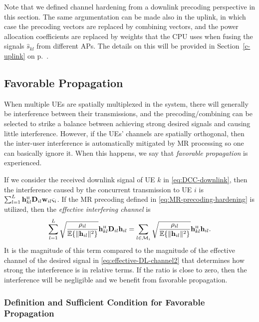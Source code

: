 Note that we defined channel hardening from a downlink precoding perspective in this section. The same argumentation can be made also in the uplink, in which case the precoding vectors are replaced by combining vectors, and the power allocation coefficients are replaced by weights that the CPU uses when fusing the signals $\hat{s}_{kl}$ from different APs. The details on this will be provided in Section~\ref{c-uplink} on p.~\pageref{c-uplink}.




\subsection{Favorable Propagation}
\label{subsec-favorable-propagation}

When multiple UEs are spatially multiplexed in the system, there will generally be interference between their transmissions, and the precoding/combining can be selected to strike a balance between achieving strong desired signals and causing little interference. 
However, if the UEs' channels are spatially orthogonal, then the inter-user interference is automatically mitigated by MR processing so one can basically ignore it. When this happens, we say that \emph{favorable propagation} is experienced.

If we consider the received downlink signal of UE $k$ in \eqref{eq:DCC-downlink}, then the interference caused by the concurrent transmission to UE $i$ is $ \sum_{l=1}^{L}  \vect{h}_{kl}^{\Htran}\vect{D}_{il}  \vect{w}_{il} \varsigma_i $. If the MR precoding defined in \eqref{eq:MR-precoding-hardening} is utilized, then the \emph{effective interfering channel} is
\begin{equation}\label{effective-interfering-channel}
 \sum_{l=1}^{L}   \sqrt{\frac{\rho_{il}}{\mathbb{E} \{\| \vect{h}_{il} \|^2 \}} }   \vect{h}_{kl}^{\Htran}\vect{D}_{il}\vect{h}_{il} =  \sum_{l \in \mathcal{M}_i}   \sqrt{\frac{\rho_{il}}{\mathbb{E} \{\| \vect{h}_{il} \|^2 \}} } \vect{h}_{kl}^{\Htran}  \vect{h}_{il}.
\end{equation}
It is the magnitude of this term compared to the magnitude of the effective channel of the desired signal in \eqref{eq:effective-DL-channel2} that determines how strong the interference is in relative terms. If the ratio is close to zero, then the interference will be negligible and we benefit from favorable propagation. 



 \subsubsection{Definition and Sufficient Condition for Favorable Propagation}

